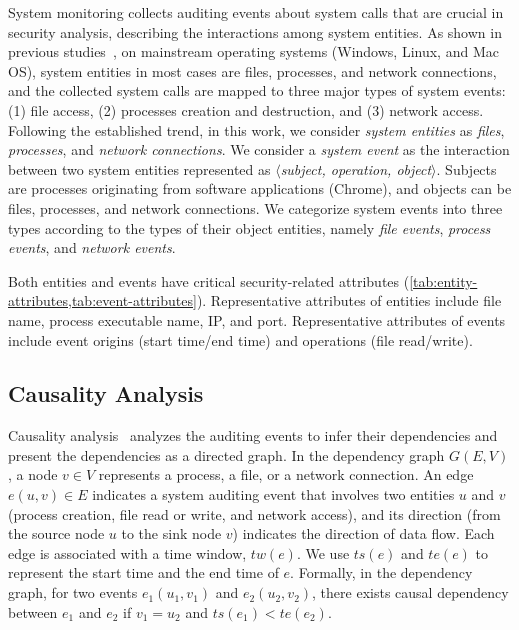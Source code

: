 System monitoring collects auditing events about system calls that are crucial in security analysis, describing the interactions among system entities.
As shown in previous studies~\cite{backtracking,backtracking2,taser,wormlog,gao2018saql,gao2018aiql,mcitracking,logtracking,liu2018priotracker,hassan2019nodoze}, on mainstream operating systems (Windows, Linux, and Mac OS), system entities in most cases are files, processes, and network connections,
and the collected system calls are mapped to three major types of system events:
(1) file access, 
(2) processes creation and destruction, and 
(3) network access. 
Following the established trend, in this work, we consider \emph{system entities} as \emph{files}, \emph{processes}, and \emph{network connections}. 
We consider a \emph{system event} as the interaction between two system entities represented as \emph{$\langle$subject, operation, object$\rangle$}. Subjects are processes originating from software applications (\eg Chrome), and objects can be files, processes, and network connections. 
We categorize system events into three types according to the types of their object entities, namely \emph{file events}, \emph{process events}, and \emph{network events}.


Both entities and events have critical security-related
attributes (\cref{tab:entity-attributes,tab:event-attributes}).
Representative attributes of entities include file name, process executable name, IP, and port.
Representative attributes of events include event origins (\eg start time/end time) and operations (\eg file read/write).

\subsection{Causality Analysis}
\label{subsec:causality-analysis}

Causality analysis~\cite{backtracking,backtracking2,taser,intrusionrecovery,liu2018priotracker,mcitracking,hassan2019nodoze,ma2016protracer} analyzes the auditing events to infer their dependencies 
and present the dependencies as a directed graph.
%
In the dependency graph $G(E,V)$, a node $v \in V$ represents a process, a file, or a network connection.
An edge $e(u, v) \in E$ indicates a system auditing event that involves two entities $u$ and $v$ (\eg process creation, file read or write, and network access), and its direction (from the source node $u$ to the sink node $v$) indicates the direction of data flow.
Each edge is associated with a time window, $tw(e)$.
We use $ts(e)$ and $te(e)$ to represent the start time and the end time of $e$.
Formally, in the dependency graph, for two events $e_1(u_1, v_1) $ and $e_2(u_2, v_2)$, there exists causal dependency between $e_1$ and $e_2$ if $v_1 = u_2$ and $ts(e_1) < te(e_2)$.


